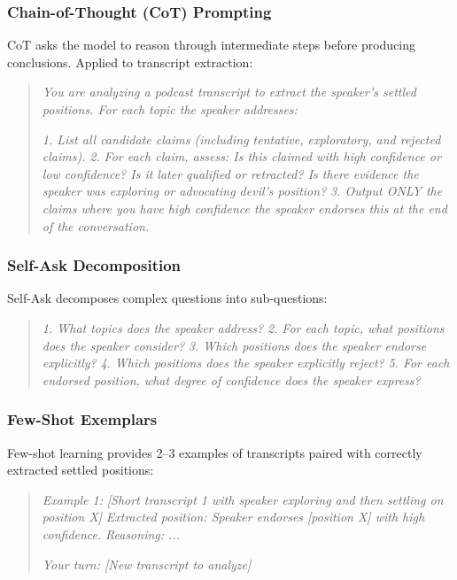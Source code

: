 \documentclass[11pt,letterpaper]{article}
\begin{document}
\subsubsection{Chain-of-Thought (CoT) Prompting}

CoT asks the model to reason through intermediate steps before producing conclusions. Applied to transcript extraction:

\begin{quote}
\textit{You are analyzing a podcast transcript to extract the speaker's settled positions. For each topic the speaker addresses:}

\textit{1. List all candidate claims (including tentative, exploratory, and rejected claims).}
\textit{2. For each claim, assess: Is this claimed with high confidence or low confidence? Is it later qualified or retracted? Is there evidence the speaker was exploring or advocating devil's position?}
\textit{3. Output ONLY the claims where you have high confidence the speaker endorses this at the end of the conversation.}
\end{quote}

\subsubsection{Self-Ask Decomposition}

Self-Ask decomposes complex questions into sub-questions:

\begin{quote}
\textit{1. What topics does the speaker address?}
\textit{2. For each topic, what positions does the speaker consider?}
\textit{3. Which positions does the speaker endorse explicitly?}
\textit{4. Which positions does the speaker explicitly reject?}
\textit{5. For each endorsed position, what degree of confidence does the speaker express?}
\end{quote}

\subsubsection{Few-Shot Exemplars}

Few-shot learning provides 2–3 examples of transcripts paired with correctly extracted settled positions:

\begin{quote}
\textit{Example 1:}
\textit{[Short transcript 1 with speaker exploring and then settling on position X]}
\textit{Extracted position: Speaker endorses [position X] with high confidence.}
\textit{Reasoning: ...}

\textit{Your turn: [New transcript to analyze]}
\end{quote}
\end{document}
